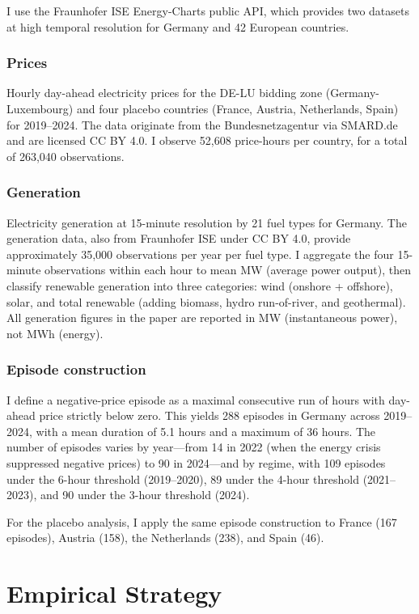 \documentclass[12pt]{article}
\begin{document}
I use the Fraunhofer ISE Energy-Charts public API, which provides two datasets at high temporal resolution for Germany and 42 European countries.

\subsubsection*{Prices} Hourly day-ahead electricity prices for the DE-LU bidding zone (Germany-Luxembourg) and four placebo countries (France, Austria, Netherlands, Spain) for 2019--2024. The data originate from the Bundesnetzagentur via SMARD.de and are licensed CC BY 4.0. I observe 52,608 price-hours per country, for a total of 263,040 observations.

\subsubsection*{Generation} Electricity generation at 15-minute resolution by 21 fuel types for Germany. The generation data, also from Fraunhofer ISE under CC BY 4.0, provide approximately 35,000 observations per year per fuel type. I aggregate the four 15-minute observations within each hour to mean MW (average power output), then classify renewable generation into three categories: wind (onshore + offshore), solar, and total renewable (adding biomass, hydro run-of-river, and geothermal). All generation figures in the paper are reported in MW (instantaneous power), not MWh (energy).

\subsubsection*{Episode construction} I define a negative-price episode as a maximal consecutive run of hours with day-ahead price strictly below zero. This yields 288 episodes in Germany across 2019--2024, with a mean duration of 5.1 hours and a maximum of 36 hours. The number of episodes varies by year---from 14 in 2022 (when the energy crisis suppressed negative prices) to 90 in 2024---and by regime, with 109 episodes under the 6-hour threshold (2019--2020), 89 under the 4-hour threshold (2021--2023), and 90 under the 3-hour threshold (2024).

For the placebo analysis, I apply the same episode construction to France (167 episodes), Austria (158), the Netherlands (238), and Spain (46).




\section{Empirical Strategy}
\label{sec:strategy}
\end{document}
